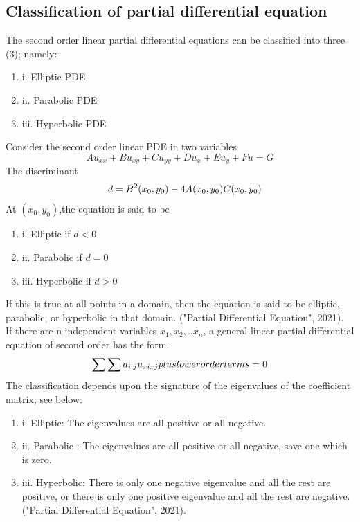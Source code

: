 \documentclass[12pt]{report}
\begin{document}
\subsection {Classification of partial differential equation}
\par The second order linear partial differential equations can be classified into three (3); namely:
\begin{enumerate}
	\item i. Elliptic PDE 
	\item ii. Parabolic PDE 
	\item iii. Hyperbolic PDE \\
\end{enumerate}

\par Consider the second order linear PDE in two variables
\begin{equation}
Au_{xx} + Bu_{xy} +Cu_{yy} +Du_x+ Eu_y+ Fu=G
\end{equation}
The discriminant\\
\begin{equation*}
\quad d=B^2(x_0,y_0) - 4A(x_0,y_0)C(x_0,y_0)\\
\end{equation*}
At $(x_0, y_0)$,the equation is said to be \\

\begin{enumerate}
	\item i. Elliptic if $d<0$
	\item ii. Parabolic if $d=0$
	\item iii. Hyperbolic if $d>0$
\end{enumerate}

If this is true at all points in a domain, then the equation is said to be elliptic, parabolic, or hyperbolic
in that domain. ("Partial Differential Equation", 2021).\\
If there are n independent variables $x_1, x_2, ..x_n$, a general linear partial differential equation of second order has the form.\\
\begin{equation*}
\sum \sum a_{i,j}u_{xixj} plus lower order terms=0 \\
\end{equation*}
The classification depends upon the signature of the eigenvalues of the coefficient matrix; see below: \\
\begin{enumerate}
	\item i. Elliptic: The eigenvalues are all positive or all
	negative.
	\item ii. Parabolic : The eigenvalues are all positive or all negative, save one which is zero.
	\item iii. Hyperbolic: There is only one negative eigenvalue and all the rest are positive, or
	there is only one positive eigenvalue and all the rest are negative.("Partial Differential Equation", 2021).
\end{enumerate}
\end{document}
